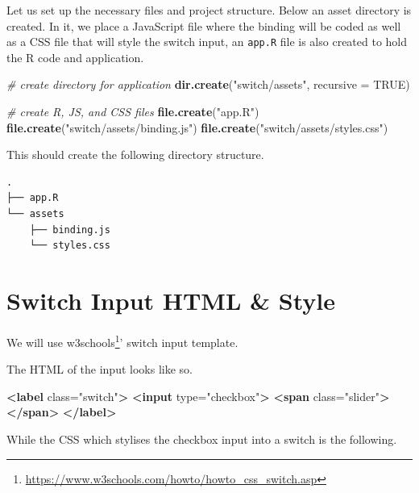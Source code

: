 \documentclass[10pt,]{krantz}
\makeatletter
\newenvironment{Shaded}{\begin{snugshade}}{\end{snugshade}}
\newcommand{\CommentTok}[1]{\textcolor[rgb]{0.37,0.37,0.37}{\textit{#1}}}
\newcommand{\DataTypeTok}[1]{\textcolor[rgb]{0.27,0.27,0.27}{#1}}
\newcommand{\KeywordTok}[1]{\textcolor[rgb]{0.27,0.27,0.27}{\textbf{#1}}}
\newcommand{\NormalTok}[1]{#1}
\newcommand{\OtherTok}[1]{\textcolor[rgb]{0.37,0.37,0.37}{#1}}
\newcommand{\StringTok}[1]{\textcolor[rgb]{0.5,0.5,0.5}{#1}}
\renewcommand{\href}[2]{#2\footnote{\url{#1}}}
\newenvironment{kframe}{%
\medskip{}
\setlength{\fboxsep}{.8em}
 \def\at@end@of@kframe{}%
 \ifinner\ifhmode%
  \def\at@end@of@kframe{\end{minipage}}%
  \begin{minipage}{\columnwidth}%
 \fi\fi%
 \def\FrameCommand##1{\hskip\@totalleftmargin \hskip-\fboxsep
 \colorbox{shadecolor}{##1}\hskip-\fboxsep
     \hskip-\linewidth \hskip-\@totalleftmargin \hskip\columnwidth}%
 \MakeFramed {\advance\hsize-\width
   \@totalleftmargin\z@ \linewidth\hsize
   \@setminipage}}%
 {\par\unskip\endMakeFramed%
 \at@end@of@kframe}
\renewenvironment{Shaded}{\begin{kframe}}{\end{kframe}}
\makeatother
\begin{document}
Let us set up the necessary files and project structure. Below an asset directory is created. In it, we place a JavaScript file where the binding will be coded as well as a CSS file that will style the switch input, an \texttt{app.R} file is also created to hold the R code and application.

\begin{Shaded}
\begin{Highlighting}[]
\CommentTok{# create directory for application}
\KeywordTok{dir.create}\NormalTok{(}\StringTok{"switch/assets"}\NormalTok{, }\DataTypeTok{recursive =} \OtherTok{TRUE}\NormalTok{)}

\CommentTok{# create R, JS, and CSS files}
\KeywordTok{file.create}\NormalTok{(}\StringTok{"app.R"}\NormalTok{)}
\KeywordTok{file.create}\NormalTok{(}\StringTok{"switch/assets/binding.js"}\NormalTok{)}
\KeywordTok{file.create}\NormalTok{(}\StringTok{"switch/assets/styles.css"}\NormalTok{)}
\end{Highlighting}
\end{Shaded}

This should create the following directory structure.

\begin{verbatim}
.
├── app.R
└── assets
    ├── binding.js
    └── styles.css
\end{verbatim}

\hypertarget{shiny-input-intro}{%
\section{Switch Input HTML \& Style}\label{shiny-input-intro}}

We will use \href{https://www.w3schools.com/howto/howto_css_switch.asp}{w3schools}' switch input template.

The HTML of the input looks like so.

\begin{Shaded}
\begin{Highlighting}[]
\KeywordTok{<label}\OtherTok{ class=}\StringTok{"switch"}\KeywordTok{>}
  \KeywordTok{<input}\OtherTok{ type=}\StringTok{"checkbox"}\KeywordTok{>}
  \KeywordTok{<span}\OtherTok{ class=}\StringTok{"slider"}\KeywordTok{></span>}
\KeywordTok{</label>}
\end{Highlighting}
\end{Shaded}

While the CSS which stylises the checkbox input into a switch is the following.
\end{document}
